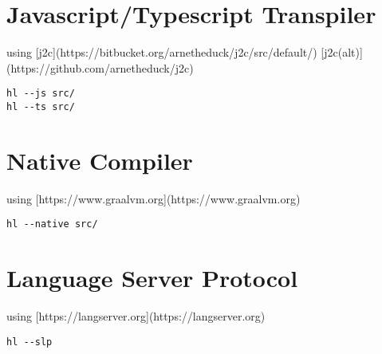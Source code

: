 \documentclass{tufte-book}
\begin{document}
        \section{Javascript/Typescript Transpiler}
        using [j2c](https://bitbucket.org/arnetheduck/j2c/src/default/)
        [j2c(alt)](https://github.com/arnetheduck/j2c)
        \begin{lstlisting}
hl --js src/
hl --ts src/
        \end{lstlisting}
        \section{Native Compiler}
        using [https://www.graalvm.org](https://www.graalvm.org)
        \begin{lstlisting}
hl --native src/
        \end{lstlisting}
        \section{Language Server Protocol}
        using [https://langserver.org](https://langserver.org)
        \begin{lstlisting}
hl --slp
        \end{lstlisting}



    \backmatter

    
    


    \printindex
	
\end{document}

